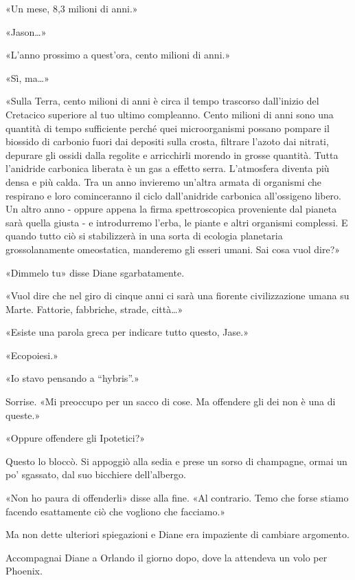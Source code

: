 «Un mese, 8,3 milioni di anni.»

«Jason\ldots»

«L'anno prossimo a quest'ora, cento milioni di anni.»

«Sì, ma\ldots»

«Sulla Terra, cento milioni di anni è circa il tempo trascorso
dall'inizio del Cretacico superiore al tuo ultimo compleanno. Cento
milioni di anni sono una quantità di tempo sufficiente perché quei
microorganismi possano pompare il biossido di carbonio fuori dai
depositi sulla crosta, filtrare l'azoto dai nitrati, depurare gli ossidi
dalla regolite e arricchirli morendo in grosse quantità. Tutta
l'anidride carbonica liberata è un gas a effetto serra. L'atmosfera
diventa più densa e più calda. Tra un anno invieremo un'altra armata di
organismi che respirano e loro cominceranno il ciclo dall'anidride
carbonica all'ossigeno libero. Un altro anno - oppure appena la firma
spettroscopica proveniente dal pianeta sarà quella giusta - e
introdurremo l'erba, le piante e altri organismi complessi. E quando
tutto ciò si stabilizzerà in una sorta di ecologia planetaria
grossolanamente omeostatica, manderemo gli esseri umani. Sai cosa vuol
dire?»

«Dimmelo tu» disse Diane sgarbatamente.

«Vuol dire che nel giro di cinque anni ci sarà una fiorente
civilizzazione umana su Marte. Fattorie, fabbriche, strade, città\ldots»

«Esiste una parola greca per indicare tutto questo, Jase.»

«Ecopoiesi.»

«Io stavo pensando a ``hybris''.»

Sorrise. «Mi preoccupo per un sacco di cose. Ma offendere gli dei non è
una di queste.»

«Oppure offendere gli Ipotetici?»

Questo lo bloccò. Si appoggiò alla sedia e prese un sorso di champagne,
ormai un po' sgassato, dal suo bicchiere dell'albergo.

«Non ho paura di offenderli» disse alla fine. «Al contrario. Temo che
forse stiamo facendo esattamente ciò che vogliono che facciamo.»

Ma non dette ulteriori spiegazioni e Diane era impaziente di cambiare
argomento.

\separatorefiori

Accompagnai Diane a Orlando il giorno dopo, dove la attendeva un volo
per Phoenix.

